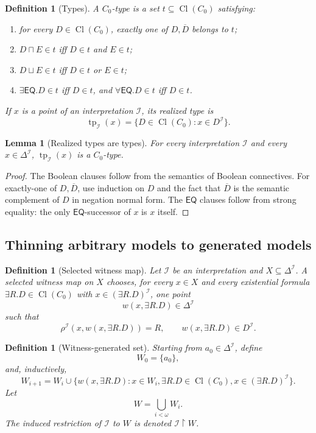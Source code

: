 \documentclass[11pt]{article}
\newtheorem{lemma}[theorem]{Lemma}
\newtheorem{definition}[theorem]{Definition}
\newcommand{\EQ}{\mathsf{EQ}}
\newcommand{\Cl}{\operatorname{Cl}}
\newcommand{\I}{\mathcal I}
\newcommand{\typ}{\operatorname{tp}}
\begin{document}
\begin{definition}[Types]\label{def:types}
A $C_0$-type is a set $t\subseteq\Cl(C_0)$ satisfying:
\begin{enumerate}[label=(T\arabic*)]
\item for every $D\in\Cl(C_0)$, exactly one of $D,\overline D$ belongs to $t$;
\item $D\sqcap E\in t$ iff $D\in t$ and $E\in t$;
\item $D\sqcup E\in t$ iff $D\in t$ or $E\in t$;
\item $\exists\EQ.D\in t$ iff $D\in t$, and $\forall\EQ.D\in t$ iff $D\in t$.
\end{enumerate}
If $x$ is a point of an interpretation $\I$, its realized type is
\[
   \typ_\I(x)=\{D\in\Cl(C_0):x\in D^\I\}.
\]
\end{definition}

\begin{lemma}[Realized types are types]\label{lem:realized-type}
For every interpretation $\I$ and every $x\in\Delta^\I$, $\typ_\I(x)$ is a $C_0$-type.
\end{lemma}

\begin{proof}
The Boolean clauses follow from the semantics of Boolean connectives.  For exactly-one of $D,\overline D$, use induction on $D$ and the fact that $\overline D$ is the semantic complement of $D$ in negation normal form.  The $\EQ$ clauses follow from strong equality: the only $\EQ$-successor of $x$ is $x$ itself.
\end{proof}

\subsection{Thinning arbitrary models to generated models}

\begin{definition}[Selected witness map]\label{def:witness-map}
Let $\I$ be an interpretation and $X\subseteq\Delta^\I$.  A selected witness map on $X$ chooses, for every $x\in X$ and every existential formula $\exists R.D\in\Cl(C_0)$ with $x\in(\exists R.D)^\I$, one point
\[
   w(x,\exists R.D)\in\Delta^\I
\]
such that
\[
   \rho^\I(x,w(x,\exists R.D))=R,
   \qquad
   w(x,\exists R.D)\in D^\I.
\]
\end{definition}

\begin{definition}[Witness-generated set]\label{def:witness-generated}
Starting from $a_0\in\Delta^\I$, define
\[
  W_0=\{a_0\},
\]
and, inductively,
\[
  W_{i+1}=W_i\cup\{w(x,\exists R.D):x\in W_i,
         \exists R.D\in\Cl(C_0),
         x\in(\exists R.D)^\I\}.
\]
Let
\[
  W=\bigcup_{i<\omega}W_i.
\]
The induced restriction of $\I$ to $W$ is denoted $\I\upharpoonright W$.
\end{definition}
\end{document}
